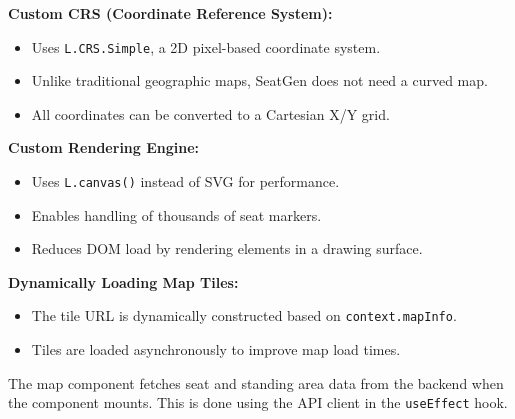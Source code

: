 \textbf{Custom CRS (Coordinate Reference System):}
\begin{itemize}
    \item Uses \texttt{L.CRS.Simple}, a 2D pixel-based coordinate system.
    \item Unlike traditional geographic maps, SeatGen does not need a curved map.
    \item All coordinates can be converted to a Cartesian X/Y grid.
\end{itemize}

\textbf{Custom Rendering Engine:}
\begin{itemize}
    \item Uses \texttt{L.canvas()} instead of SVG for performance.
    \item Enables handling of thousands of seat markers.
    \item Reduces DOM load by rendering elements in a drawing surface.
\end{itemize}

\newpage

\textbf{Dynamically Loading Map Tiles:}
\begin{itemize}
    \item The tile URL is dynamically constructed based on \texttt{context.mapInfo}.
    \item Tiles are loaded asynchronously to improve map load times.
\end{itemize}


The map component fetches seat and standing area data from the backend when the component mounts. This is done using the API client in the \texttt{useEffect} hook.

